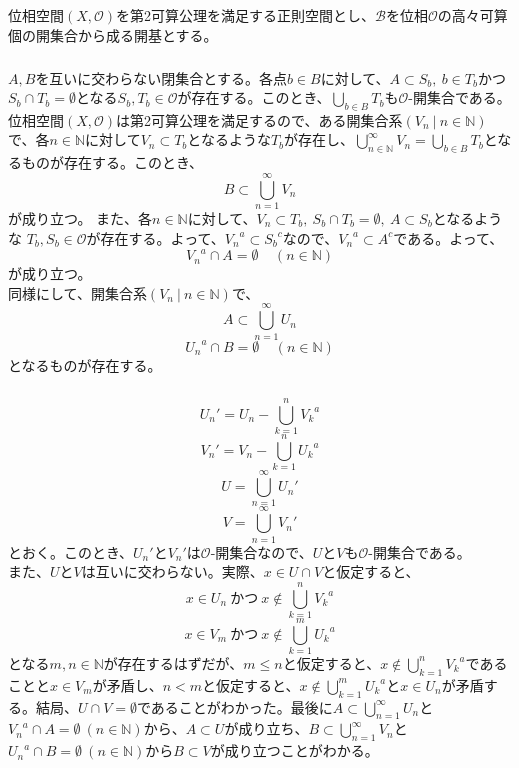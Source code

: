 \documentclass{jsarticle}
\begin{document}
\subsection{}
位相空間$(X,\mathcal{O})$を第2可算公理を満足する正則空間とし、$\mathcal{B}$を位相$\mathcal{O}$の高々可算個の開集合から成る開基とする。
\subsubsection{}
$A,B$を互いに交わらない閉集合とする。各点$b\in B$に対して、$A\subset S_b,\ b\in T_b$かつ$S_b\cap T_b=\emptyset$となる$S_b,T_b\in\mathcal{O}$が存在する。このとき、$\bigcup_{b\in B}T_b$も$\mathcal{O}$-開集合である。位相空間$(X,\mathcal{O})$は第2可算公理を満足するので、ある開集合系$(V_n\ |\ n\in\mathbb{N})$で、各$n\in \mathbb{N}$に対して$V_n\subset T_b$となるような$T_b$が存在し、$\bigcup_{n\in\mathbb{N}}^{\infty}V_n=\bigcup_{b\in B}T_b$となるものが存在する。このとき、
\[B\subset\bigcup_{n=1}^{\infty}V_n\]
が成り立つ。
また、各$n\in\mathbb{N}$に対して、$V_n\subset T_b,\ S_b\cap T_b=\emptyset,\ A\subset S_b$となるような $T_b,S_b\in\mathcal{O}$が存在する。よって、${V_n}^a\subset {S_b}^c$なので、${V_n}^a\subset A^c$である。よって、
\[{V_n}^a\cap A=\emptyset \ \ \ \ \ (n\in\mathbb{N})\]
が成り立つ。\\
同様にして、開集合系$(V_n\ |\ n\in\mathbb{N})$で、
\[A\subset\bigcup_{n=1}^{\infty}U_n\]
\[{U_n}^a\cap B=\emptyset \ \ \ \ \ (n\in\mathbb{N})\]
となるものが存在する。

\subsubsection{}
\[{U_n}'=U_n-\bigcup_{k=1}^{n}{V_k}^a\]
\[{V_n}'=V_n-\bigcup_{k=1}^{n}{U_k}^a\]
\[U=\bigcup_{n=1}^{\infty}{U_n}'\]
\[V=\bigcup_{n=1}^{\infty}{V_n}'\]
とおく。このとき、${U_n}'$と${V_n}'$は$\mathcal{O}$-開集合なので、$U$と$V$も$\mathcal{O}$-開集合である。\\
また、$U$と$V$は互いに交わらない。実際、$x\in U\cap V$と仮定すると、
\[x\in U_n \ かつ\ x\notin\bigcup_{k=1}^n{V_k}^a\]
\[x\in V_m \ かつ\ x\notin\bigcup_{k=1}^m{U_k}^a\]
となる$m,n\in\mathbb{N}$が存在するはずだが、$m\leq n$と仮定すると、$x\notin\bigcup_{k=1}^n{V_k}^a$であることと$x\in V_m$が矛盾し、$n<m$と仮定すると、$x\notin\bigcup_{k=1}^m{U_k}^a$と$x\in U_n$が矛盾する。結局、$U\cap V=\emptyset$であることがわかった。最後に$A\subset\bigcup_{n=1}^{\infty}U_n$と${V_n}^a\cap A=\emptyset \ (n\in\mathbb{N})$から、$A\subset U$が成り立ち、$B\subset\bigcup_{n=1}^{\infty}V_n$と${U_n}^a\cap B=\emptyset \ (n\in\mathbb{N})$から$B\subset V$が成り立つことがわかる。
\end{document}
